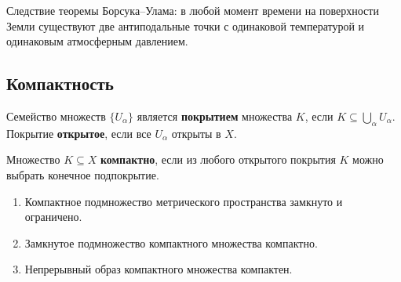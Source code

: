 \documentclass[12pt]{article}
\begin{document}
	\begin{note}
		Следствие теоремы Борсука--Улама: в любой момент времени на поверхности Земли существуют две антиподальные точки с одинаковой температурой и одинаковым атмосферным давлением.
	\end{note}
	
	\subsection{Компактность}
	
	\begin{definition}
		Семейство множеств $\{U_\alpha\}$ является \textbf{покрытием} множества $K$, если $K \subseteq \bigcup_\alpha U_\alpha$. Покрытие \textbf{открытое}, если все $U_\alpha$ открыты в $X$.
	\end{definition}
	
	\begin{definition}
		Множество $K \subseteq X$ \textbf{компактно}, если из любого открытого покрытия $K$ можно выбрать конечное подпокрытие.
	\end{definition}
	
	\begin{theorem}
		\begin{enumerate}
			\item Компактное подмножество метрического пространства замкнуто и ограничено.
			\item Замкнутое подмножество компактного множества компактно.
			\item Непрерывный образ компактного множества компактен.
		\end{enumerate}
	\end{theorem}
	
\end{document}
